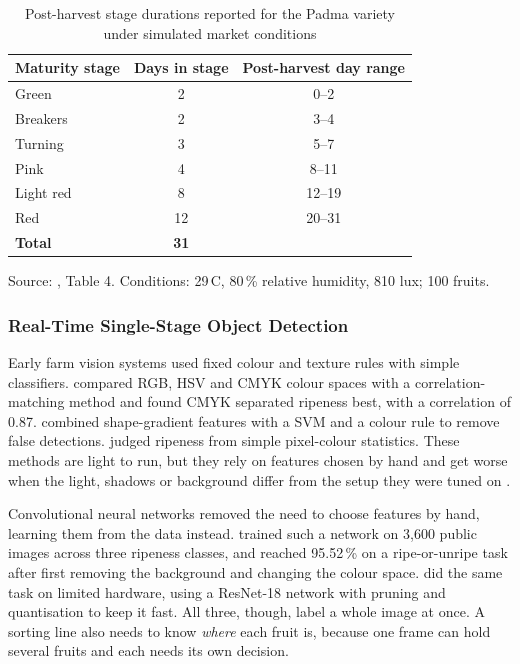 \begin{table}[H]
\caption{Post-harvest stage durations reported for the Padma variety under simulated market conditions}
\label{tab:abekoon_stages}
\centering
\begin{tabular}{lcc}
\toprule
\textbf{Maturity stage} & \textbf{Days in stage} & \textbf{Post-harvest day range} \\
\midrule
Green       & 2  & 0--2   \\
Breakers    & 2  & 3--4   \\
Turning     & 3  & 5--7   \\
Pink        & 4  & 8--11  \\
Light red   & 8  & 12--19 \\
Red         & 12 & 20--31 \\
\midrule
\textbf{Total} & \textbf{31} & \\
\bottomrule
\end{tabular}

\vspace{2mm}
{\footnotesize Source: \citet{abekoon2024}, Table 4. Conditions: 29\,\textdegree C, 80\,\% relative humidity, 810 lux; 100 fruits.}
\end{table}

\subsubsection{Real-Time Single-Stage Object Detection}
\label{sec:detection}

Early farm vision systems used fixed colour and texture rules with simple classifiers. \citet{santoso2024} compared \acrshort{RGB}, \acrshort{HSV} and CMYK colour spaces with a correlation-matching method and found CMYK separated ripeness best, with a correlation of 0.87. \citet{liu2019} combined shape-gradient features with a \acrfull{SVM} and a colour rule to remove false detections. \citet{garcia2019} judged ripeness from simple pixel-colour statistics. These methods are light to run, but they rely on features chosen by hand and get worse when the light, shadows or background differ from the setup they were tuned on \citep{ifmalinda2023}.

Convolutional neural networks removed the need to choose features by hand, learning them from the data instead. \citet{allo2025} trained such a network on 3,600 public images across three ripeness classes, and \citet{centino2025} reached 95.52\,\% on a ripe-or-unripe task after first removing the background and changing the colour space. \citet{waseem2025} did the same task on limited hardware, using a ResNet-18 network with pruning and quantisation to keep it fast. All three, though, label a whole image at once. A sorting line also needs to know \emph{where} each fruit is, because one frame can hold several fruits and each needs its own decision.

